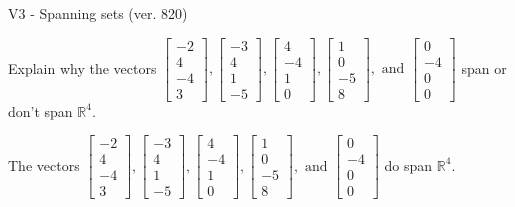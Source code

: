 \begin{exercise}
  \begin{exerciseTitle}V3 - Spanning sets (ver. 820)\end{exerciseTitle}
  \begin{exerciseStatement}
    Explain why the vectors \(\left[\begin{array}{r}
-2 \\
4 \\
-4 \\
3
\end{array}\right] , \left[\begin{array}{r}
-3 \\
4 \\
1 \\
-5
\end{array}\right] , \left[\begin{array}{r}
4 \\
-4 \\
1 \\
0
\end{array}\right] , \left[\begin{array}{r}
1 \\
0 \\
-5 \\
8
\end{array}\right] , \text{ and } \left[\begin{array}{r}
0 \\
-4 \\
0 \\
0
\end{array}\right]\) span or don't span \(\mathbb{R}^4\). 
	


  \end{exerciseStatement}
  \begin{exerciseAnswer}
   The vectors \(\left[\begin{array}{r}
-2 \\
4 \\
-4 \\
3
\end{array}\right] , \left[\begin{array}{r}
-3 \\
4 \\
1 \\
-5
\end{array}\right] , \left[\begin{array}{r}
4 \\
-4 \\
1 \\
0
\end{array}\right] , \left[\begin{array}{r}
1 \\
0 \\
-5 \\
8
\end{array}\right] , \text{ and } \left[\begin{array}{r}
0 \\
-4 \\
0 \\
0
\end{array}\right]\) 
  	 do  
	span \(\mathbb{R}^4\).
  


  \end{exerciseAnswer}
\end{exercise}